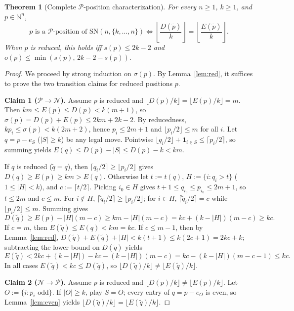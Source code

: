 \documentclass[11pt]{article}
\newtheorem{theorem}{Theorem}
\begin{document}
\begin{theorem}[Complete $\mathcal{P}$-position characterization]\label{thm:char}
For every $n \ge 1$, $k \ge 1$, and $p \in \mathbb{N}^n$,
\[
p \text{ is a }\mathcal{P}\text{-position of }\mathrm{SN}(n, \{k, \dots, n\})
\iff
\left\lfloor \frac{D(\tilde p)}{k} \right\rfloor =
\left\lfloor \frac{E(\tilde p)}{k} \right\rfloor.
\]
When $p$ is reduced, this holds iff $s(p) \le 2k - 2$ and
$o(p) \le \min(s(p),\, 2k - 2 - s(p))$.
\end{theorem}

\begin{proof}
We proceed by strong induction on $\sigma(p)$. By Lemma~\ref{lem:red}, it
suffices to prove the two transition claims for reduced positions $p$.

\medskip
\noindent\textbf{Claim 1 ($\mathcal{P} \to \mathcal{N}$).}
Assume $p$ is reduced and $\lfloor D(p)/k \rfloor = \lfloor E(p)/k \rfloor = m$.
Then $k m \le E(p) \le D(p) < k(m + 1)$, so
$\sigma(p) = D(p) + E(p) \le 2km + 2k - 2$. By reducedness,
$k p_i \le \sigma(p) < k(2m + 2)$, hence $p_i \le 2m + 1$ and
$\lfloor p_i / 2 \rfloor \le m$ for all $i$. Let $q = p - e_S$ ($|S| \ge k$)
be any legal move. Pointwise $\lfloor q_i / 2 \rfloor + \mathbf{1}_{i \in S}
\le \lceil p_i / 2 \rceil$, so summing yields
$E(q) \le D(p) - |S| \le D(p) - k < k m$.

If $q$ is reduced ($\tilde q = q$), then $\lceil q_i / 2 \rceil \ge \lfloor p_i / 2 \rfloor$
gives $D(q) \ge E(p) \ge k m > E(q)$. Otherwise let $t := t(q)$,
$H := \{i : q_i > t\}$ ($1 \le |H| < k$), and $c := \lceil t / 2 \rceil$.
Picking $i_0 \in H$ gives $t + 1 \le q_{i_0} \le p_{i_0} \le 2m + 1$, so
$t \le 2m$ and $c \le m$. For $i \notin H$,
$\lceil \tilde q_i / 2 \rceil \ge \lfloor p_i / 2 \rfloor$; for $i \in H$,
$\lceil \tilde q_i / 2 \rceil = c$ while $\lfloor p_i / 2 \rfloor \le m$.
Summing gives
\[
D(\tilde q) \ge E(p) - |H|(m - c) \ge k m - |H|(m - c)
= k c + (k - |H|)(m - c) \ge k c.
\]
If $c = m$, then $E(\tilde q) \le E(q) < k m = k c$. If $c \le m - 1$, then
by Lemma~\ref{lem:red},
$D(\tilde q) + E(\tilde q) + |H| < k(t + 1) \le k(2c + 1) = 2k c + k$;
subtracting the lower bound on $D(\tilde q)$ yields
\[
E(\tilde q) < 2k c + (k - |H|) - k c - (k - |H|)(m - c)
= k c - (k - |H|)(m - c - 1) \le k c.
\]
In all cases $E(\tilde q) < k c \le D(\tilde q)$, so
$\lfloor D(\tilde q)/k \rfloor \ne \lfloor E(\tilde q)/k \rfloor$.

\medskip
\noindent\textbf{Claim 2 ($\mathcal{N} \to \mathcal{P}$).}
Assume $p$ is reduced and $\lfloor D(p)/k \rfloor \ne \lfloor E(p)/k \rfloor$.
Let $O := \{i : p_i \text{ odd}\}$. If $|O| \ge k$, play $S = O$; every entry
of $q = p - e_O$ is even, so Lemma~\ref{lem:even} yields
$\lfloor D(\tilde q)/k \rfloor = \lfloor E(\tilde q)/k \rfloor$.


\end{proof}
\end{document}
